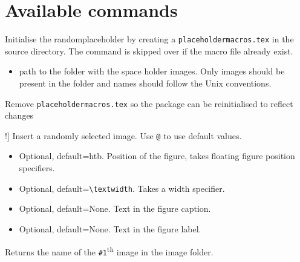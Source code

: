 \documentclass[12pt]{article}
\begin{document}
    \section{Available commands}
    \begin{description}
        \item[\lstinline!\placeholderinit{#1}!] 
        Initialise the randomplaceholder by creating a \linebreak \lstinline!placeholdermacros.tex! in the source directory. The command is skipped over if the macro file already exist.
            \begin{itemize}
                \item[\lstinline!#1!] path to the folder with the space holder images. Only images should be present in the folder and names should follow the Unix conventions.
            \end{itemize}
        \item[\lstinline!\placeholderclean!] Remove \lstinline!placeholdermacros.tex! so the package can be reinitialised to reflect changes 
        \item[\lstinline!\placeholder[#1][#2][#3][#4]!] Insert a randomly selected image. Use \lstinline{@} to use default values.
            \begin{itemize}
                \item[\lstinline{#1}] Optional, default=htb. Position of the figure, takes floating figure position specifiers.
                \item[\lstinline{#2}] Optional, default=\lstinline{\textwidth}. Takes a width specifier.
                \item[\lstinline{#3}] Optional, default=None. Text in the figure caption.
                \item[\lstinline{#4}] Optional, default=None. Text in the figure label.  
            \end{itemize}
        \item[\lstinline!\placeholderimage{#1}!] Returns the name of the \lstinline{#1}\textsuperscript{th} image in the image folder. 
    \end{description}
\end{document}
